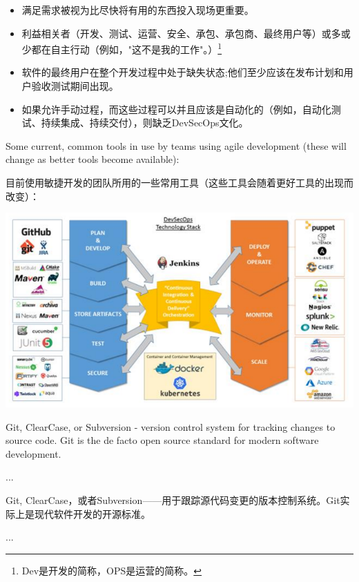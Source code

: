 \documentclass[oneside]{book}
\begin{document}
\begin{paracol}{2}
\begin{rightcolumn}
\begin{itemize}
            \item 满足需求被视为比尽快将有用的东西投入现场更重要。
            \item 利益相关者（开发、测试、运营、安全、承包、承包商、最终用户等）或多或少都在自主行动（例如，"这不是我的工作"。）\footnote*[2]{Dev是开发的简称，OPS是运营的简称。}
            \item 软件的最终用户在整个开发过程中处于缺失状态;他们至少应该在发布计划和用户验收测试期间出现。
            \item 如果允许手动过程，而这些过程可以并且应该是自动化的（例如，自动化测试、持续集成、持续交付），则缺乏DevSecOps文化。
        \end{itemize}
    \end{rightcolumn}
\end{paracol}

\begin{paracol}{2}
    \begin{leftcolumn}
        Some current, common tools in use by teams using agile development (these will change as better tools become available):
    \end{leftcolumn}
    \begin{rightcolumn}
        目前使用敏捷开发的团队所用的一些常用工具（这些工具会随着更好工具的出现而改变）：
    \end{rightcolumn}
\end{paracol}

\begin{center}
    \includegraphics[width = .9\textwidth]{images/figure1.png}
\end{center}

\begin{paracol}{2}
    \begin{leftcolumn}
        Git, ClearCase, or Subversion - version control system for tracking changes to source code. Git is the de facto open source standard for modern software development.

        ...
    \end{leftcolumn}
    \begin{rightcolumn}
        Git, ClearCase，或者Subversion——用于跟踪源代码变更的版本控制系统。Git实际上是现代软件开发的开源标准。

        ...
    \end{rightcolumn}
\end{paracol}
\end{document}
